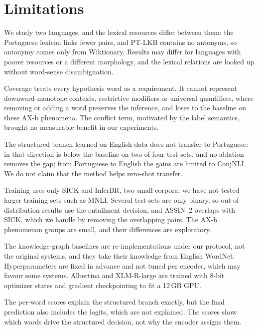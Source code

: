 \section*{Limitations}

We study two languages, and the lexical resources differ between
them: the Portuguese lexicon links fewer pairs, and PT-LKB contains no antonyms, so antonymy comes only
from Wiktionary. Results may differ for languages with poorer resources or a different
morphology, and the lexical relations are looked up without word-sense disambiguation.

Coverage treats every hypothesis word as a requirement. It cannot represent
downward-monotone contexts, restrictive modifiers or universal quantifiers, where removing or adding a
word preserves the inference, and \model{} loses to the baseline on these AX-b phenomena. The conflict
term, motivated by the label semantics, brought no measurable benefit in our experiments.

The structured branch learned on English data does not transfer to
Portuguese: in that direction \model{} is below the \cls{} baseline on two of four test sets, and no
ablation removes the gap; from Portuguese to English the gains are limited to ConjNLI. We do not claim that the method helps zero-shot transfer.

Training uses only SICK and InferBR, two small corpora; we have not
tested larger training sets such as MNLI. Several test sets are only binary, so out-of-distribution
results use the entailment decision, and ASSIN~2 overlaps with SICK, which we handle by removing the
overlapping pairs. The AX-b phenomenon groups are small, and their differences are exploratory.

The knowledge-graph baselines are re-implementations under our
protocol, not the original systems, and they take their knowledge from English WordNet. Hyperparameters
are fixed in advance and not tuned per encoder, which may favour some systems. Albertina and XLM-R-large
are trained with 8-bit optimizer states and gradient checkpointing to fit a 12\,GB GPU.

The per-word scores explain the structured branch exactly, but the final
prediction also includes the \cls{} logits, which are not explained. The scores show which words drive
the structured decision, not why the encoder assigns them.

